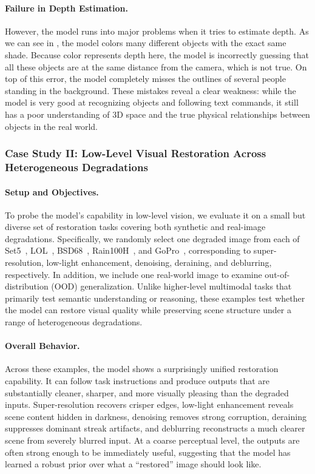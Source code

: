 \documentclass{llmxive}
\begin{document}
\paragraph{Failure in Depth Estimation.} 
However, the model runs into major problems when it tries to estimate depth. As we can see in , the model colors many different objects with the exact same shade. Because color represents depth here, the model is incorrectly guessing that all these objects are at the same distance from the camera, which is not true. On top of this error, the model completely misses the outlines of several people standing in the background. These mistakes reveal a clear weakness: while the model is very good at recognizing objects and following text commands, it still has a poor understanding of 3D space and the true physical relationships between objects in the real world.

\subsubsection{Case Study II: Low-Level Visual Restoration Across Heterogeneous Degradations}

\paragraph{Setup and Objectives.}
To probe the model's capability in low-level vision, we evaluate it on a small but diverse set of restoration tasks covering both synthetic and real-image degradations. Specifically, we randomly select one degraded image from each of Set5~\citep{bevilacqua2012set5}, LOL~\citep{wei2018lol}, BSD68~\citep{martin2001bsd68}, Rain100H~\citep{yang2017rain100h}, and GoPro~\citep{nah2017gopro}, corresponding to super-resolution, low-light enhancement, denoising, deraining, and deblurring, respectively. In addition, we include one real-world image to examine out-of-distribution (OOD) generalization. Unlike higher-level multimodal tasks that primarily test semantic understanding or reasoning, these examples test whether the model can restore visual quality while preserving scene structure under a range of heterogeneous degradations.

\paragraph{Overall Behavior.}
Across these examples, the model shows a surprisingly unified restoration capability. It can follow task instructions and produce outputs that are substantially cleaner, sharper, and more visually pleasing than the degraded inputs. Super-resolution recovers crisper edges, low-light enhancement reveals scene content hidden in darkness, denoising removes strong corruption, deraining suppresses dominant streak artifacts, and deblurring reconstructs a much clearer scene from severely blurred input. At a coarse perceptual level, the outputs are often strong enough to be immediately useful, suggesting that the model has learned a robust prior over what a ``restored'' image should look like.
\end{document}
